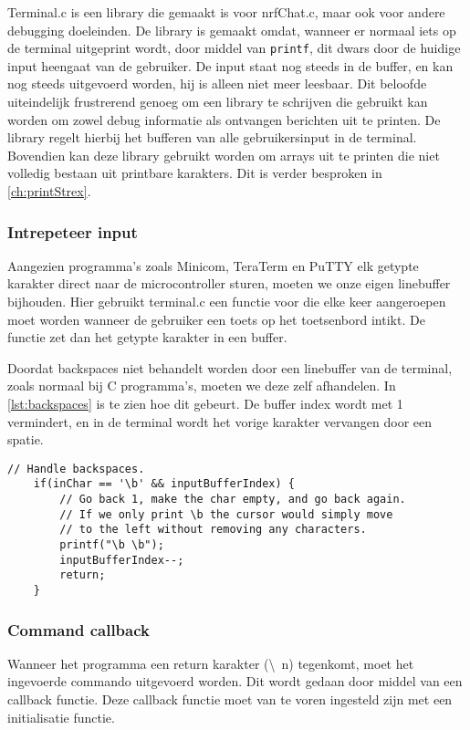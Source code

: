 
Terminal.c is een library die gemaakt is voor nrfChat.c, maar ook voor andere debugging doeleinden. De library is gemaakt omdat, wanneer er normaal iets op de terminal uitgeprint wordt, door middel van \texttt{printf}, dit dwars door de huidige input heengaat van de gebruiker. De input staat nog steeds in de buffer, en kan nog steeds uitgevoerd worden, hij is alleen niet meer leesbaar. Dit beloofde uiteindelijk frustrerend genoeg om een library te schrijven die gebruikt kan worden om zowel debug informatie als ontvangen berichten uit te printen. De library regelt hierbij het bufferen van alle gebruikersinput in de terminal. Bovendien kan deze library gebruikt worden om arrays uit te printen die niet volledig bestaan uit printbare karakters. Dit is verder besproken in \autoref{ch:printStrex}.

\subsubsection{Intrepeteer input}
Aangezien programma's zoals Minicom, TeraTerm en PuTTY elk getypte karakter direct naar de microcontroller sturen, moeten we onze eigen linebuffer bijhouden. Hier gebruikt terminal.c een functie voor die elke keer aangeroepen moet worden wanneer de gebruiker een toets op het toetsenbord intikt. De functie zet dan het getypte karakter in een buffer. 

Doordat backspaces niet behandelt worden door een linebuffer van de terminal, zoals normaal bij C programma's, moeten we deze zelf afhandelen. In \autoref{lst:backspaces} is te zien hoe dit gebeurt. De buffer index wordt met 1 vermindert, en in de terminal wordt het vorige karakter vervangen door een spatie.



\begin{lstlisting}[caption={Backspaces afhandelen},captionpos=b,label={lst:backspaces},style=c,xleftmargin=.\textwidth,xrightmargin=.\textwidth]
    // Handle backspaces.
    if(inChar == '\b' && inputBufferIndex) {
        // Go back 1, make the char empty, and go back again.
        // If we only print \b the cursor would simply move
        // to the left without removing any characters.
        printf("\b \b");
        inputBufferIndex--;
        return;
    }
\end{lstlisting}

\subsubsection{Command callback}
Wanneer het programma een return karakter (\textbackslash~n) tegenkomt, moet het ingevoerde commando uitgevoerd worden. Dit wordt gedaan door middel van een callback functie. Deze callback functie moet van te voren ingesteld zijn met een initialisatie functie.

